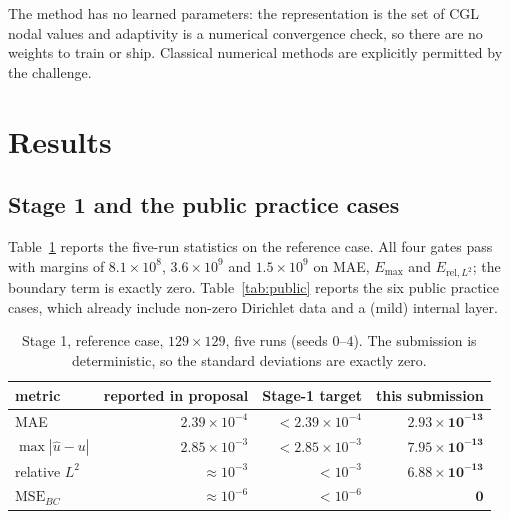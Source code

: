 \documentclass[10pt,a4paper]{article}
\newcommand{\sMae}{2.93\times10^{-13}}
\newcommand{\sMax}{7.95\times10^{-13}}
\newcommand{\sRel}{6.88\times10^{-13}}
\begin{document}
The method has no learned parameters: the representation is the set of CGL
nodal values and adaptivity is a numerical convergence check, so there are no
weights to train or ship.  Classical numerical methods are explicitly permitted
by the challenge.

\section{Results}

\subsection{Stage 1 and the public practice cases}
Table~\ref{tab:stage1} reports the five-run statistics on the reference case.
All four gates pass with margins of $8.1\times10^8$, $3.6\times10^9$ and
$1.5\times10^9$ on MAE, $E_{\max}$ and $E_{\mathrm{rel},L^2}$; the boundary term
is exactly zero.  Table~\ref{tab:public} reports the six public practice cases,
which already include non-zero Dirichlet data and a (mild) internal layer.

\begin{table}[h]
\centering
\caption{Stage 1, reference case, $129\times129$, five runs (seeds $0$--$4$).
The submission is deterministic, so the standard deviations are exactly zero.}
\label{tab:stage1}
\footnotesize
\begin{tabular}{lrrr}
\toprule
metric & reported in proposal & Stage-1 target & this submission \\
\midrule
MAE & $2.39\times10^{-4}$ & $<2.39\times10^{-4}$ & $\mathbf{\sMae}$ \\
$\max|\hat u-u|$ & $2.85\times10^{-3}$ & $<2.85\times10^{-3}$ & $\mathbf{\sMax}$ \\
relative $L^2$ & $\approx10^{-3}$ & $<10^{-3}$ & $\mathbf{\sRel}$ \\
$\mathrm{MSE}_{BC}$ & $\approx10^{-6}$ & $<10^{-6}$ & $\mathbf{0}$ \\
\bottomrule
\end{tabular}
\end{table}
\end{document}
